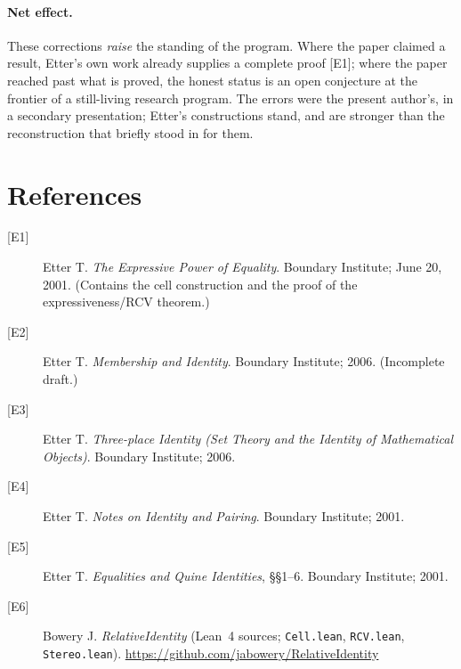 \documentclass[11pt]{article}
\begin{document}
\paragraph{Net effect.} These corrections \emph{raise} the standing of the program. Where the
paper claimed a result, Etter's own work already supplies a complete proof [E1]; where the
paper reached past what is proved, the honest status is an open conjecture at the frontier of
a still-living research program. The errors were the present author's, in a secondary
presentation; Etter's constructions stand, and are stronger than the reconstruction that
briefly stood in for them.

\section*{References}

\begin{description}
\item[{[E1]}] Etter T. \emph{The Expressive Power of Equality}. Boundary Institute; June 20,
2001. (Contains the cell construction and the proof of the expressiveness/RCV theorem.)
\item[{[E2]}] Etter T. \emph{Membership and Identity}. Boundary Institute; 2006. (Incomplete
draft.)
\item[{[E3]}] Etter T. \emph{Three-place Identity (Set Theory and the Identity of
Mathematical Objects)}. Boundary Institute; 2006.
\item[{[E4]}] Etter T. \emph{Notes on Identity and Pairing}. Boundary Institute; 2001.
\item[{[E5]}] Etter T. \emph{Equalities and Quine Identities}, \S\S1--6. Boundary Institute;
2001.
\item[{[E6]}] Bowery J. \emph{RelativeIdentity} (Lean~4 sources; \texttt{Cell.lean},
\texttt{RCV.lean}, \texttt{Stereo.lean}). \url{https://github.com/jabowery/RelativeIdentity}
\end{description}
\end{document}

